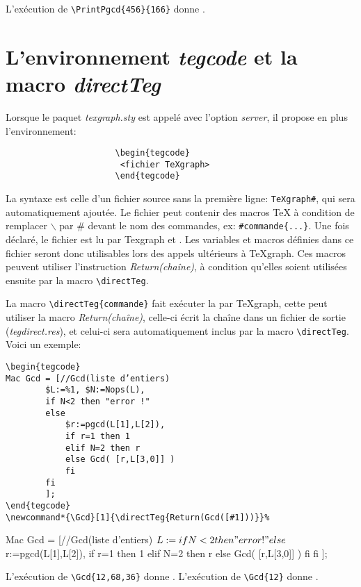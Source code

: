 L'exécution de \verb|\PrintPgcd{456}{166}| donne .

\section{L'environnement \textit{tegcode} et la macro \textit{directTeg}}

Lorsque le paquet \textit{texgraph.sty} est appelé avec l'option \textit{server}, il propose en plus l'environnement:
\begin{verbatim}
                      \begin{tegcode}
                       <fichier TeXgraph>
                      \end{tegcode}
\end{verbatim}

La syntaxe est celle d'un fichier source sans la première ligne: \texttt{TeXgraph\#}, qui sera automatiquement ajoutée. Le fichier peut contenir des macros \TeX{} à condition de remplacer $\backslash$ par \# devant le nom des commandes, ex: \verb|#commande{...}|. Une fois déclaré, le fichier est lu par Texgraph et . Les variables et macros définies dans ce fichier seront donc utilisables lors des appels ultérieurs à TeXgraph. Ces macros peuvent utiliser l'instruction \textit{Return(chaîne)}, à condition qu'elles soient utilisées ensuite par la macro \verb|\directTeg|.

La macro \verb|\directTeg{commande}| fait exécuter la  par TeXgraph, cette  peut utiliser la macro \textit{Return(chaîne)}, celle-ci écrit la chaîne dans un fichier de sortie (\textit{tegdirect.res}), et celui-ci sera automatiquement inclus par la macro \verb|\directTeg|. Voici un exemple:
\begin{small}
\begin{verbatim}
\begin{tegcode}
Mac Gcd = [//Gcd(liste d’entiers)
        $L:=%1, $N:=Nops(L),
        if N<2 then "error !"
        else
            $r:=pgcd(L[1],L[2]),
            if r=1 then 1
            elif N=2 then r
            else Gcd( [r,L[3,0]] )
            fi
        fi
        ];
\end{tegcode}
\newcommand*{\Gcd}[1]{\directTeg{Return(Gcd([#1]))}}%
\end{verbatim}
\end{small}

\begin{tegcode}
Mac Gcd = [//Gcd(liste d’entiers)
        $L:=%
        if N<2 then "error !"
        else
            $r:=pgcd(L[1],L[2]),
            if r=1 then 1
            elif N=2 then r
            else Gcd( [r,L[3,0]] )
            fi
        fi
        ];
\end{tegcode}
\newcommand*{\Gcd}[1]{\directTeg{Return(Gcd([#1]))}}%

L'exécution de \verb|\Gcd{12,68,36}| donne \Gcd{12,68,36}.
 L'exécution de \verb|\Gcd{12}| donne \Gcd{12}.
